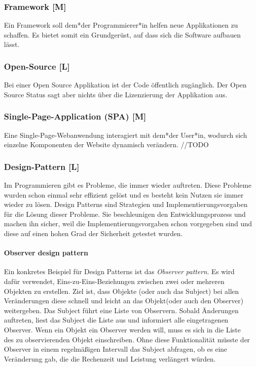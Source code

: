 \subsubsection{Framework [M]}

Ein Framework soll dem*der Programmierer*in helfen neue Applikationen zu schaffen. Es bietet somit ein Grundgerüst, auf dass sich die Software aufbauen lässt.  

\subsubsection{Open-Source [L]}
Bei einer Open Source Applikation ist der Code öffentlich zugänglich. Der Open Source Status sagt aber nichts über die Lizenzierung der Applikation aus. \cite{WhatOpenSource}

\subsubsection{Single-Page-Application (SPA) [M]}
Eine Single-Page-Webanwendung interagiert mit dem*der User*in, wodurch sich einzelne Komponenten der Website dynamisch verändern. //TODO

\subsubsection{Design-Pattern [L]}
Im Programmieren gibt es Probleme, die immer wieder auftreten. Diese Probleme wurden schon einmal sehr effizient gelöst und es besteht kein Nutzen sie immer wieder zu lösen. Design Patterns sind Strategien und Implementierungsvorgaben für die Lösung dieser Probleme. Sie beschleunigen den Entwicklungsprozess und machen ihn sicher, weil die Implementierungsvorgaben schon vorgegeben sind und diese auf einen hohen Grad der Sicherheit getestet wurden. \cite{DesignPatterns}

\paragraph{Observer design pattern}
\label{txt:glos:observerDesignPattern}
Ein konkretes Beispiel für Design Patterns ist das \emph{Observer pattern}. Es wird dafür verwendet, Eins-zu-Eins-Beziehungen zwischen zwei oder mehreren Objekten zu erstellen. Ziel ist, dass Objekte (oder auch das Subject) bei allen Veränderungen diese schnell und leicht an das Objekt(oder auch den Observer) weitergeben.  Das Subject führt eine Liste von Observern. Sobald Änderungen auftreten, liest das Subject die Liste aus und informiert alle eingetragenen Observer. Wenn ein Objekt ein Observer werden will, muss es sich in die Liste des zu observierenden Objekt einschreiben. Ohne diese Funktionalität müsste der Observer in einem regelmäßigen Intervall das Subject abfragen, ob es eine Veränderung gab, die die Rechenzeit und Leistung verlängert würden. \cite{ObserverPatternExplaination}

